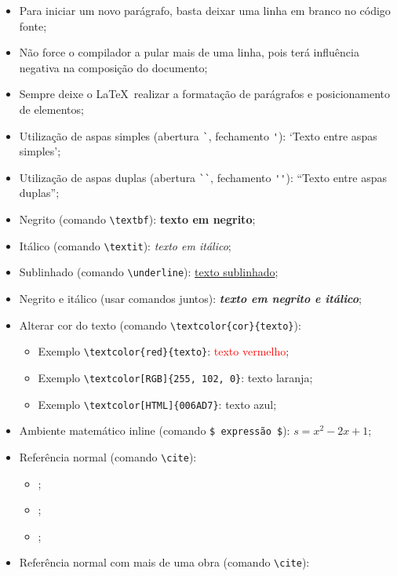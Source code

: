      \begin{itemize}
     	\item Para iniciar um novo parágrafo, basta deixar uma linha em branco no código fonte;
     	\item Não force o compilador a pular mais de uma linha, pois terá influência negativa na composição do documento;
     	\item Sempre deixe o \LaTeX\ realizar a formatação de parágrafos e posicionamento de elementos;
     	\item Utilização de aspas simples (abertura \verb|`|, fechamento \verb|'|): `Texto entre aspas simples';
     	\item Utilização de aspas duplas (abertura \verb|``|, fechamento \verb|''|): ``Texto entre aspas duplas'';
     	\item Negrito (comando \verb|\textbf|): \textbf{texto em negrito};
     	\item Itálico (comando \verb|\textit|): \textit{texto em itálico};
     	\item Sublinhado (comando \verb|\underline|): \underline{texto sublinhado};
     	\item Negrito e itálico (usar comandos juntos): \textbf{\textit{texto em negrito e itálico}};
     	\item Alterar cor do texto (comando \verb|\textcolor{cor}{texto}|):
     	\begin{itemize}
     		\item Exemplo \verb|\textcolor{red}{texto}|: \textcolor{red}{texto vermelho};
     		\item Exemplo \verb|\textcolor[RGB]{255, 102, 0}|: \textcolor[RGB]{255, 102, 0}{texto laranja};
     		\item Exemplo \verb|\textcolor[HTML]{006AD7}|: \textcolor[HTML]{006AD7}{texto azul};
     	\end{itemize}
     	\item Ambiente matemático inline (comando \verb|$ expressão $|): $s = x^2-2x +1$;
     	\item Referência normal (comando \verb|\cite|):
     	\begin{itemize}
     		\item \cite{Agaisse1995};
     		\item \cite{Abedi2014};
     		\item \cite{BtNomenclature2016};
     	\end{itemize}
     	\item Referência normal com mais de uma obra (comando \verb|\cite|):

\end{itemize}
